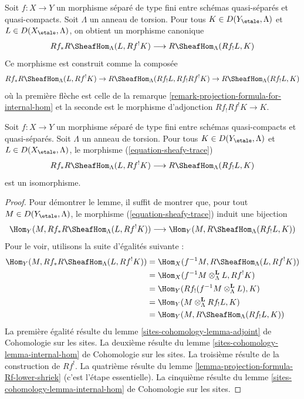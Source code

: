 \noindent
Soit $f : X \to Y$ un morphisme séparé de type fini entre schémas quasi-séparés
et quasi-compacts. Soit $\Lambda$ un anneau de torsion.
Pour tous $K \in D(Y_\etale, \Lambda)$ et $L \in D(X_\etale, \Lambda)$,
on obtient un morphisme canonique
\begin{equation}
\label{equation-sheafy-trace}
Rf_*R\SheafHom_\Lambda(L, Rf^!K) \longrightarrow R\SheafHom_\Lambda(Rf_!L, K)
\end{equation}
Ce morphisme est construit comme la composée
$$
Rf_*R\SheafHom_\Lambda(L, Rf^!K) \to
R\SheafHom_\Lambda(Rf_!L, Rf_!Rf^!K) \to
R\SheafHom_\Lambda(Rf_!L, K)
$$
où la première flèche est celle de la
remarque \ref{remark-projection-formula-for-internal-hom}
et la seconde est le morphisme d'adjonction $Rf_!Rf^!K \to K$.

\begin{lemma}
\label{lemma-iso-on-RSheafHom}
Soit $f : X \to Y$ un morphisme séparé de type fini entre schémas quasi-compacts et
quasi-séparés. Soit $\Lambda$ un anneau de torsion.
Pour tous $K \in D(Y_\etale, \Lambda)$ et $L \in D(X_\etale, \Lambda)$,
le morphisme (\ref{equation-sheafy-trace})
$$
Rf_*R\SheafHom_\Lambda(L, Rf^!K) \longrightarrow R\SheafHom_\Lambda(Rf_!L, K)
$$
est un isomorphisme.
\end{lemma}

\begin{proof}
Pour démontrer le lemme, il suffit de montrer que, pour tout $M \in D(Y_\etale, \Lambda)$,
le morphisme (\ref{equation-sheafy-trace}) induit une bijection
$$
\Hom_Y(M, Rf_*R\SheafHom_\Lambda(L, Rf^!K))
\longrightarrow
\Hom_Y(M, R\SheafHom_\Lambda(Rf_!L, K))
$$
Pour le voir, utilisons la suite d'égalités suivante :
\begin{align*}
\Hom_Y(M, Rf_*R\SheafHom_\Lambda(L, Rf^!K))
& =
\Hom_X(f^{-1}M, R\SheafHom_\Lambda(L, Rf^!K)) \\
& =
\Hom_X(f^{-1}M \otimes_\Lambda^\mathbf{L} L, Rf^!K) \\
& =
\Hom_Y(Rf_!(f^{-1}M \otimes_\Lambda^\mathbf{L} L), K) \\
& =
\Hom_Y(M \otimes_\Lambda^\mathbf{L} Rf_!L, K) \\
& =
\Hom_Y(M, R\SheafHom_\Lambda(Rf_!L, K))
\end{align*}
La première égalité résulte du
lemme \ref{sites-cohomology-lemma-adjoint} de Cohomologie sur les sites.
La deuxième résulte du
lemme \ref{sites-cohomology-lemma-internal-hom} de Cohomologie sur les sites.
La troisième résulte de la construction de $Rf^!$.
La quatrième résulte du lemme \ref{lemma-projection-formula-Rf-lower-shriek}
(c'est l'étape essentielle).
La cinquième résulte du
lemme \ref{sites-cohomology-lemma-internal-hom} de Cohomologie sur les sites.
\end{proof}

